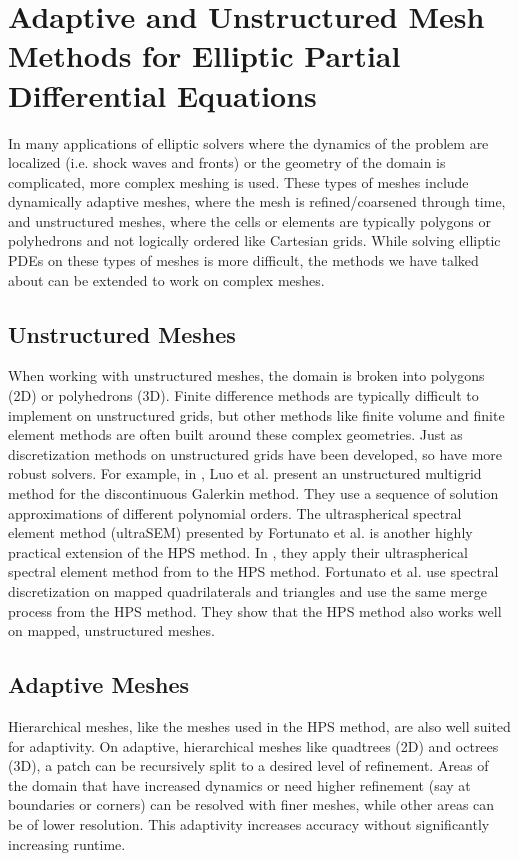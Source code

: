 \section{Adaptive and Unstructured Mesh Methods for Elliptic Partial Differential Equations}
\label{sec:adaptive}

In many applications of elliptic solvers where the dynamics of the problem are localized (i.e. shock waves and fronts) or the geometry of the domain is complicated, more complex meshing is used. These types of meshes include dynamically adaptive meshes, where the mesh is refined/coarsened through time, and unstructured meshes, where the cells or elements are typically polygons or polyhedrons and not logically ordered like Cartesian grids. While solving elliptic PDEs on these types of meshes is more difficult, the methods we have talked about can be extended to work on complex meshes.

\subsection{Unstructured Meshes}

When working with unstructured meshes, the domain is broken into polygons (2D) or polyhedrons (3D). Finite difference methods are typically difficult to implement on unstructured grids, but other methods like finite volume and finite element methods are often built around these complex geometries. Just as discretization methods on unstructured grids have been developed, so have more robust solvers. For example, in \citep{luo2006p}, Luo et al. present an unstructured multigrid method for the discontinuous Galerkin method. They use a sequence of solution approximations of different polynomial orders. The ultraspherical spectral element method (ultraSEM) presented by Fortunato et al. is another highly practical extension of the HPS method. In \citep{fortunato2020ultraspherical}, they apply their ultraspherical spectral element method from \citep{olver2013fast} to the HPS method. Fortunato et al. use spectral discretization on mapped quadrilaterals and triangles and use the same merge process from the HPS method. They show that the HPS method also works well on mapped, unstructured meshes.

\subsection{Adaptive Meshes}

Hierarchical meshes, like the meshes used in the HPS method, are also well suited for adaptivity. On adaptive, hierarchical meshes like quadtrees (2D) and octrees (3D), a patch can be recursively split to a desired level of refinement. Areas of the domain that have increased dynamics or need higher refinement (say at boundaries or corners) can be resolved with finer meshes, while other areas can be of lower resolution. This adaptivity increases accuracy without significantly increasing runtime.

